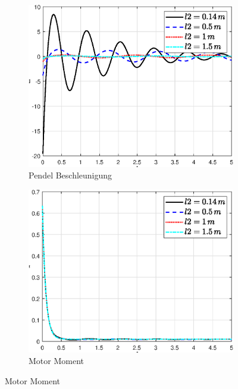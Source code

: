 \begin{figure}
\begin{subfigure}[b]{0.49 \linewidth}
    \end{subfigure}
    \begin{subfigure}[b]{0.49 \linewidth}
        \includegraphics[width=\linewidth]{Bilder/5_sensi/fig/l2/theta_punkt_punkt.eps}
        \caption{Pendel Beschleunigung}
        \label{fig:l2_theta_punkt_punkt}
    \end{subfigure}
    \begin{subfigure}[b]{0.49\linewidth}
        \includegraphics[width=\linewidth]{Bilder/5_sensi/fig/l2/tau.eps}
        \caption{Motor Moment}
        \label{fig:l2_tau}
    \end{subfigure}

\end{figure}
